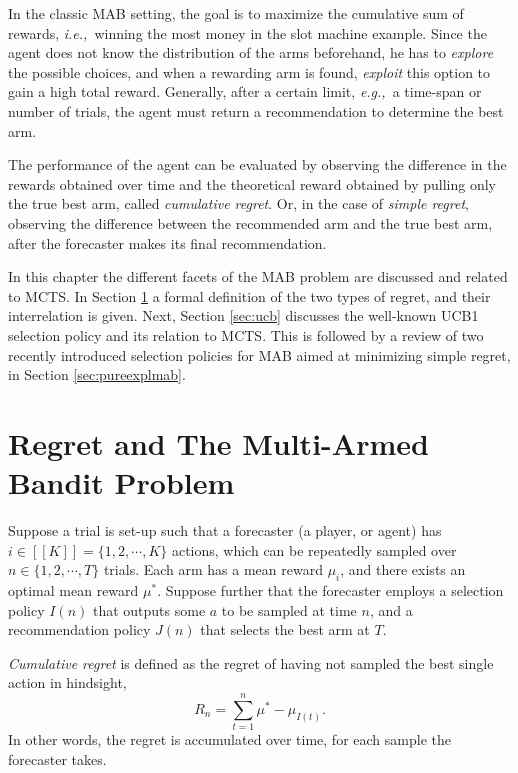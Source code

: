 \documentclass{kecsmstr}
\newcommand{\eg}{{\it e.g.,}~}
\newcommand{\ie}{{\it i.e.,}~}
\begin{document}
In the classic MAB setting, the goal is to maximize the cumulative sum of rewards, \ie winning the most money in the slot machine example. Since the agent does not know the distribution of the arms beforehand, he has to \emph{explore} the possible choices, and when a rewarding arm is found, \emph{exploit} this option to gain a high total reward. Generally, after a certain limit, \eg a time-span or number of trials, the agent must return a recommendation to determine the best arm.

The performance of the agent can be evaluated by observing the difference in the rewards obtained over time and the theoretical reward obtained by pulling only the true best arm, called \emph{cumulative regret}. Or, in the case of \emph{simple regret}, observing the difference between the recommended arm and the true best arm, after the forecaster makes its final recommendation.
\vspace{2 mm}

In this chapter the different facets of the MAB problem are discussed and related to MCTS. In Section \ref{sec:mabprob} a formal definition of the two types of regret, and their interrelation is given. Next, Section \ref{sec:ucb} discusses the well-known UCB1 selection policy and its relation to MCTS. This is followed by a review of two recently introduced selection policies for MAB aimed at minimizing simple regret, in Section \ref{sec:pureexplmab}.
\newpage
\section{Regret and The Multi-Armed Bandit Problem}
\label{sec:mabprob}
Suppose a trial is set-up such that a forecaster (a player, or agent) has $i \in [[K]] = \{1, 2, \cdots, K \}$ actions, which can be repeatedly sampled over $n \in \{ 1, 2, \cdots, T \}$ trials. Each arm has a mean reward $\mu_i$, and there exists an optimal mean reward $\mu^*$. Suppose further that the forecaster employs a selection policy $I(n)$ that outputs some $a$ to be sampled at time $n$, and a recommendation policy $J(n)$ that selects the best arm at $T$.

\emph{Cumulative regret} is defined as the regret of having not sampled the best single action in hindsight, 
\begin{equation}
R_n = \sum_{t = 1}^{n}{\mu^* - \mu_{I(t)}}.
\end{equation}
In other words, the regret is accumulated over time, for each sample the forecaster takes.
\end{document}
